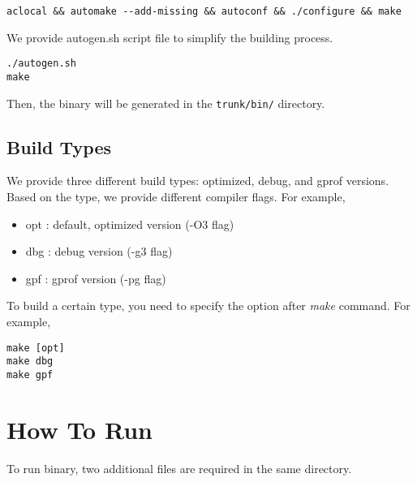 \begin{Verbatim}
aclocal && automake --add-missing && autoconf && ./configure && make
\end{Verbatim}

\noindent
We provide autogen.sh script file to simplify the building process.

\begin{Verbatim}
./autogen.sh
make
\end{Verbatim}

\noindent
Then, the binary \bin will be generated in the \Verb+trunk/bin/+
directory.





\subsection{Build Types}

We provide three different build types: optimized, debug, and gprof
versions. Based on the type, we provide different compiler flags. For
example,

\begin{itemize}
  \item opt : default, optimized version (-O3 flag)
  \item dbg : debug version (-g3 flag)
  \item gpf : gprof version (-pg flag)
\end{itemize}

\noindent
To build a certain type, you need to specify the option
after \textit{make} command. For example,

\begin{Verbatim}
make [opt]
make dbg
make gpf
\end{Verbatim}





\section{How To Run \SIM}
\label{sec:run}

To run \bin binary, two additional files are required in
the same directory.

